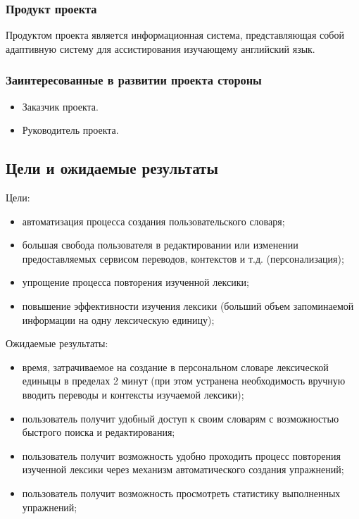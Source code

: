 \documentclass[a4paper,14pt]{extarticle}
\begin{document}
\subsubsection{Продукт проекта}
Продуктом проекта является информационная система, представляющая собой
адаптивную систему для ассистирования изучающему английский язык.

\subsubsection{Заинтересованные в развитии проекта стороны}
\begin{itemize}
    \item Заказчик проекта.
    \item Руководитель проекта.
\end{itemize}

\subsection{Цели и ожидаемые результаты}
Цели:
\begin{itemize}
    \item автоматизация процесса создания пользовательского словаря;
    \item большая свобода пользователя в редактировании или изменении
          предоставляемых сервисом переводов, контекстов и т.д. (персонализация);
    \item упрощение процесса повторения изученной лексики;
    \item повышение эффективности изучения лексики (больший объем запоминаемой
          информации на одну лексическую единицу);
\end{itemize}

Ожидаемые результаты:
\begin{itemize}
    \item время, затрачиваемое на создание в персональном словаре лексической
          единыцы в пределах 2 минут (при этом устранена необходимость вручную
          вводить переводы и контексты изучаемой лексики);
    \item пользователь получит удобный доступ к своим словарям с возможностью
          быстрого поиска и редактирования;
    \item пользователь получит возможность удобно проходить процесс повторения
          изученной лексики через механизм автоматического создания упражнений;
    \item пользователь получит возможность просмотреть статистику выполненных
          упражнений;
\end{itemize}
\end{document}
